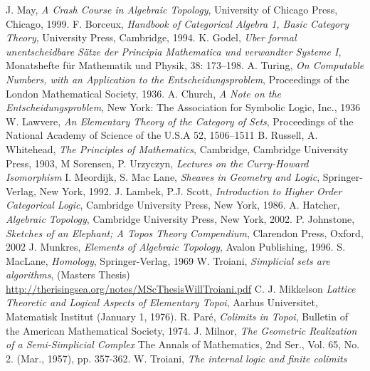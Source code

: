\documentclass{birkjour}
\theoremstyle{plain}
\theoremstyle{definition}
\begin{document}
	\begin{thebibliography}{99}
	 J. May, \emph{A Crash Course in Algebraic Topology}, University of Chicago Press, Chicago, 1999.
	 F. Borceux, \emph{Handbook of Categorical Algebra 1, Basic Category Theory}, University Press, Cambridge, 1994.
	 K. Godel, \emph{Uber formal unentscheidbare Sätze der Principia Mathematica und verwandter Systeme I}, Monatshefte für Mathematik und Physik, 38: 173–198.
	 A. Turing, \emph{On Computable Numbers, with an Application to the Entscheidungsproblem}, Proceedings of the London Mathematical Society, 1936.
	 A. Church, \emph{A Note on the Entscheidungsproblem}, New York: The Association for Symbolic Logic, Inc., 1936
	 W. Lawvere, \emph{An Elementary Theory of the Category of Sets}, Proceedings of
	the National Academy of Science of the U.S.A 52, 1506–1511
	 B. Russell, A. Whitehead, \emph{The Principles of Mathematics}, Cambridge, Cambridge University Press, 1903,
	 M Sorensen, P. Urzyczyn, \emph{Lectures on the Curry-Howard Isomorphism}
	 I. Meordijk, S. Mac Lane, \emph{Sheaves in Geometry and Logic}, Springer-Verlag, New York, 1992.
	 J. Lambek, P.J. Scott, \emph{Introduction to Higher Order Categorical Logic}, Cambridge University Press, New York, 1986.
	 A. Hatcher, \emph{Algebraic Topology}, Cambridge University Press, New York, 2002.
	 P. Johnstone, \emph{Sketches of an Elephant; A Topos Theory Compendium}, Clarendon Press, Oxford, 2002
	 J. Munkres, \emph{Elements of Algebraic Topology}, Avalon Publishing, 1996.
	 S. MacLane, \emph{Homology}, Springer-Verlag, 1969
	 W. Troiani, \emph{Simplicial sets are algorithms}, (Masters Thesis) \url{http://therisingsea.org/notes/MScThesisWillTroiani.pdf}
	 C. J. Mikkelson \emph{Lattice Theoretic and Logical Aspects of Elementary Topoi}, Aarhus Universitet, Matematisk Institut (January 1, 1976).
	 R. Paré, \emph{Colimits in Topoi}, Bulletin of the American Mathematical Society, 1974.
	 J. Milnor, \emph{The Geometric Realization of a Semi-Simplicial Complex} The Annals of Mathematics, 2nd Ser., Vol. 65, No. 2. (Mar., 1957), pp. 357-362.
	 W. Troiani, \emph{The internal logic and finite colimits}
	\end{thebibliography}
\end{document}

